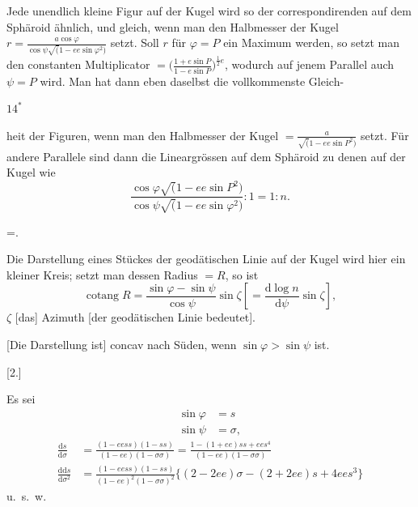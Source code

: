 \noindent Jede unendlich kleine Figur auf der Kugel wird so der correspondirenden
auf dem Sphäroid ähnlich, und gleich, wenn man den Halbmesser der Kugel
\(r=\frac{a\cos\varphi}{\cos\psi\surd(1-ee\sin\varphi^2)}\) setzt. Soll \(r\) für \(\varphi=P\)
ein Maximum werden, so setzt man den constanten Multiplicator
\(=\bigl(\frac{1+e\sin P}{1-e\sin P}\bigr)^{\frac12 e}\), wodurch auf jenem Parallel
auch \(\psi=P\) wird. Man hat dann eben daselbst die vollkommenste Gleich-
\par\smallskip
\noindent\hfill \(14^{*}\)\hspace{.12\textwidth}\par

\par\clearpage
\noindent{}\makebox[12mm][r]{}\par\medskip

\noindent heit der Figuren, wenn man den Halbmesser der Kugel
\(=\frac a{\surd(1-ee\sin P^2)}\) setzt. Für andere Parallele sind dann die Lineargrössen
auf dem Sphäroid zu denen auf der Kugel wie
\[
\frac{\cos\varphi\surd(1-ee\sin P^2)}{\cos\psi\surd(1-ee\sin\varphi^2)}:1=1:n.
\]

=\frac{\sin\varphi-\sin\psi}{\cos\psi}.
\]

\noindent Die Darstellung eines Stückes der geodätischen Linie auf der Kugel wird
hier ein kleiner Kreis; setzt man dessen Radius \(=R\), so ist
\[
\operatorname{cotang} R=\frac{\sin\varphi-\sin\psi}{\cos\psi}\sin\zeta
\left[=\frac{\mathrm d\log n}{\mathrm d\psi}\sin\zeta\right],
\]
\noindent [wo] \(\zeta\) [das] Azimuth [der geodätischen Linie bedeutet].

[Die Darstellung ist] concav nach Süden, wenn \(\sin\varphi>\sin\psi\) ist.

\bigskip
\begin{center}[2.]\end{center}
Es sei
\[
\begin{aligned}
\sin\varphi&=s\\
\sin\psi&=\sigma,
\end{aligned}
\]
\noindent [also]
\[
\begin{aligned}
\frac{\mathrm ds}{\mathrm d\sigma}
&=\frac{(1-eess)(1-ss)}{(1-ee)(1-\sigma\sigma)}
=\frac{1-(1+ee)ss+ees^4}{(1-ee)(1-\sigma\sigma)}\\
\frac{\mathrm{dd}s}{\mathrm d\sigma^2}
&=\frac{(1-eess)(1-ss)}{(1-ee)^2(1-\sigma\sigma)^2}
\{(2-2ee)\sigma-(2+2ee)s+4ees^3\}
\end{aligned}
\]
\noindent\hfill u.\ s.\ w.\hfill\null\par

